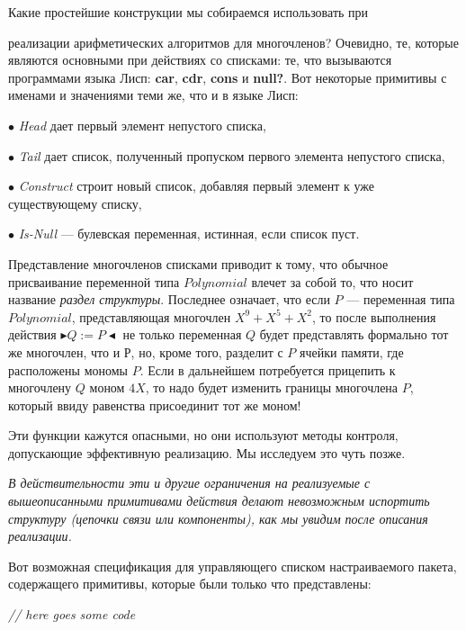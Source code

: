 \documentclass{../../template/mai_book}
\begin{document}
Какие простейшие конструкции мы собираемся использовать при

\newpage


\noindent
реализации арифметических алгоритмов для многочленов? Очевидно, те, которые являются основными при действиях со списками: те, что вызываются программами языка Лисп: \textbf{car}, \textbf{cdr}, \textbf{cons} и \textbf{null?}. Вот некоторые примитивы с именами и значениями теми же, что и в языке Лисп:

$\bullet$ \textit{Head} дает первый элемент непустого списка,

$\bullet$ \textit{Tail} дает список, полученный пропуском первого элемента 
непустого списка,

$\bullet$ \textit{Construct} строит новый список, добавляя первый элемент к уже существующему списку,

$\bullet$ \textit{Is-Null} — булевская переменная, истинная, если список пуст.

Представление многочленов списками приводит к тому, что обычное присваивание переменной типа $Polynomial$ влечет за собой то, что носит название \textit{раздел структуры}. Последнее означает, что если $P$ — переменная типа $Polynomial$, представляющая многочлен $X^9 + X^5 + X^2$, то после выполнения действия $\blacktriangleright Q := P \blacktriangleleft$ не только переменная $Q$ будет представлять формально тот же многочлен, что и Р, но, кроме того, разделит с $P$ ячейки памяти, где расположены мономы $P$. Если в дальнейшем потребуется прицепить к многочлену $Q$ моном $4X$, то надо будет изменить границы многочлена $P$, который ввиду равенства присоединит тот же моном!

Эти функции кажутся опасными, но они используют методы контроля, допускающие эффективную реализацию. Мы исследуем это чуть позже.

\textit{В действительности эти и другие ограничения на реализуемые с вышеописанными примитивами действия делают невозможным испортить структуру (цепочки связи или компоненты), как мы увидим после описания реализации.}

Вот возможная спецификация для управляющего списком настраиваемого пакета, содержащего примитивы, которые были только что представлены: \newline

\textit{// here goes some code}

\newpage
\end{document}
